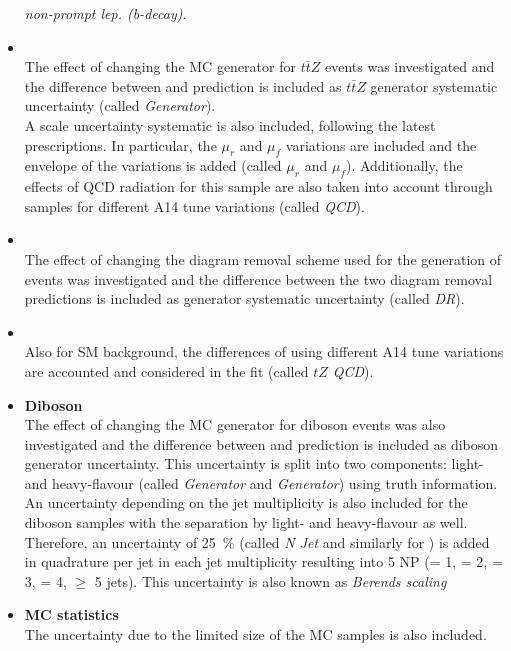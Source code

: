 \begin{itemize}
	\textit{\ttbar non-prompt lep. (b-decay)}. \\
	\item \textbf{\ttZ} \\
	The effect of changing the MC generator for $t\bar{t}Z$ events was
	investigated and the difference between \aMCatNLO and \Sherpa
	prediction is included as $t\bar{t}Z$ generator systematic
	uncertainty (called \textit{\ttZ Generator}). \\
	A scale uncertainty systematic is also included, following the
	latest prescriptions. In particular, the $\mu_r$ and $\mu_f$
	variations are included and the envelope of the variations is added 
	(called \textit{\ttZ $\mu_r$} and \textit{$\mu_f$}).
	Additionally, the effects of QCD radiation for this
	sample are also taken into account through samples for different A14
	tune variations (called \textit{\ttZ QCD}).\\
	\item \textbf{\tWZ} \\
	The effect of changing the diagram removal scheme used for the generation of \tWZ events was
	investigated and the difference between the two diagram removal
	predictions is included as \tWZ generator systematic uncertainty
	(called \textit{\tWZ DR}).\\
	\item \textbf{\tZq} \\
	Also for SM \tZq background, the differences of using different A14
	tune variations are accounted and considered in the fit (called
	\textit{$tZ$ QCD}).\\
	\item \textbf{Diboson} \\
	The effect of changing the MC generator for diboson events was also
	investigated and the difference between \Sherpa and \PowhegBox
	prediction is included as diboson generator uncertainty. This
	uncertainty is split into two components: light- and heavy-flavour
	(called \textit{\VVLF Generator} and \textit{\VVHF Generator}) using truth information. \\
	An uncertainty depending on the jet multiplicity is also included for
	the diboson samples with the separation by light- and heavy-flavour as
	well. Therefore, an uncertainty of \SI{25}{\%} 
	(called \textit{\VVLF N Jet} and similarly for \VVHF) is added in quadrature
	per jet in each jet multiplicity resulting into 
	5 NP (= 1, = 2, = 3, = 4, $\geq$ 5 jets). This uncertainty is also known as \textit{Berends scaling} \\ 
	\item \textbf{MC statistics} \\ 
	The uncertainty due to the limited size of the MC samples is also included.
\end{itemize}

